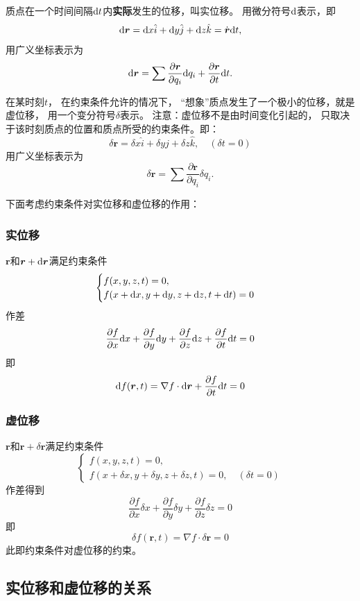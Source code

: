 质点在一个时间间隔\(\mathrm{d} t\)内\textbf{实际}发生的位移，叫实位移。
用微分符号\(\mathrm{d}\)表示，即
\[\mathrm{d}\boldsymbol{r}=\mathrm{d} x\hat{i}+\mathrm{d} y\hat{j}+\mathrm{d} z\hat{k}=\dot{\boldsymbol{r}}\mathrm{d} t,\]
用广义坐标表示为
\[\mathrm{d}\boldsymbol{r}=\sum\dfrac{\partial \boldsymbol{r}}{\partial q_i}\mathrm{d} q_i+\dfrac{\partial \boldsymbol{r}}{\partial t}\mathrm{d} t.\]

在某时刻\(t\)，
在约束条件允许的情况下，
“想象”质点发生了一个极小的位移，就是虚位移，
用一个变分符号\(\delta\)表示。
注意：虚位移不是由时间变化引起的，
只取决于该时刻质点的位置和质点所受的约束条件。即：
\[\delta\boldsymbol{r}=\delta x\hat{i}+\delta y\hat{j}+\delta z\hat{k}, \quad (\delta t=0)\]
用广义坐标表示为
\[\delta\boldsymbol{r}=\sum\dfrac{\partial \boldsymbol{r}}{\partial q_i}\delta q_i.\]

下面考虑约束条件对实位移和虚位移的作用：

\subsubsection*{实位移}

\(\boldsymbol{r}\)和\(\boldsymbol{r}+\mathrm{d}\boldsymbol{r}\)满足约束条件
\[\begin{cases}
    f(x,y,z,t)=0,\\
    f(x+\mathrm{d} x,y+\mathrm{d} y,z+\mathrm{d} z,t+\mathrm{d} t)=0
\end{cases}\]
作差
\[\dfrac{\partial f}{\partial x}\mathrm{d} x+\dfrac{\partial f}{\partial y}\mathrm{d} y+\dfrac{\partial f}{\partial z}\mathrm{d} z+\dfrac{\partial f}{\partial t}\mathrm{d} t=0\]
即
\[\mathrm{d} f(\boldsymbol{r},t)=\nabla f\cdot\mathrm{d}\boldsymbol{r}+\dfrac{\partial f}{\partial t}\mathrm{d} t=0\]

\subsubsection*{虚位移}

\(\boldsymbol{r}\)和\(\boldsymbol{r}+\delta\boldsymbol{r}\)满足约束条件
\[\begin{cases}
    f(x,y,z,t)=0,\\
    f(x+\delta x,y+\delta y,z+\delta z,t)=0,\quad(\delta t=0)
\end{cases}\]
作差得到
\[\dfrac{\partial f}{\partial x}\delta x+\dfrac{\partial f}{\partial y}\delta y+\dfrac{\partial f}{\partial z}\delta z=0\]
即
\[\delta f(\boldsymbol{r},t)=\nabla f\cdot\delta\boldsymbol{r}=0\]
此即约束条件对虚位移的约束。

\subsection*{实位移和虚位移的关系}

